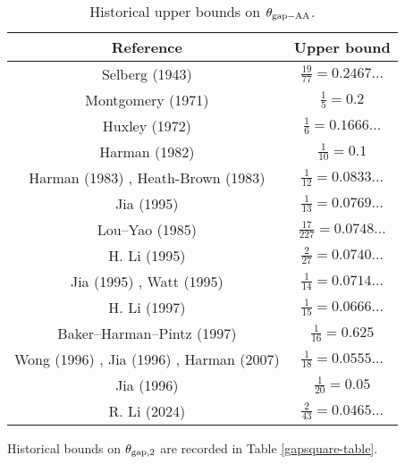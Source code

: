 \begin{table}[ht]
    \caption{Historical upper bounds on $\theta_{\mathrm{gap-AA}}$.}
    \centering
    \renewcommand{\arraystretch}{1.2}
    \begin{tabular}{|c|c|}
    \hline
    Reference & Upper bound \\
    \hline
    Selberg (1943) \cite{selberg_1943} & $\frac{19}{77}=0.2467\dots$\\
    \hline
    Montgomery (1971) \cite{montgomery_topics_1971} & $\frac{1}{5}=0.2$ \\
    \hline
    Huxley (1972) \cite{Huxley} & $\frac{1}{6} = 0.1666\dots$ \\
    \hline
    Harman (1982) \cite{harman_1982} & $\frac{1}{10} = 0.1$ \\
    \hline
    Harman (1983) \cite{harman_1983}, Heath-Brown (1983) \cite{heathbrown_sieve_1984}  & $\frac{1}{12} = 0.0833\dots$ \\
    \hline
    Jia (1995) \cite{jia_goldbach_1994} & $\frac{1}{13} = 0.0769\dots$ \\
    \hline
    Lou--Yao (1985) \cite{lou_yao_1985} & $\frac{17}{227}= 0.0748\dots$ \\
    \hline
    H. Li (1995) \cite{li_goldbach_1995} & $\frac{2}{27} = 0.0740\dots$ \\
    \hline
    Jia (1995) \cite{jia_difference_1995}, Watt (1995) \cite{watt_short_1995} & $\frac{1}{14}=0.0714\dots$ \\
    \hline
    H. Li (1997) \cite{li_short_1997} & $\frac{1}{15}=0.0666\dots$ \\
    \hline
    Baker--Harman--Pintz (1997) \cite{baker-harman-pintz_goldbach_1997} & $\frac{1}{16} = 0.625$ \\
    \hline
    Wong (1996) \cite{wong_thesis_1996}, Jia (1996) \cite{jia_exceptional_1996}, Harman (2007) \cite{harman-book} & $\frac{1}{18} = 0.0555\dots$ \\
    \hline
    Jia (1996) \cite{jia_almost_all} & $\frac{1}{20} = 0.05$ \\
    \hline
    R. Li (2024) \cite{li_primes_almost_2024} & $\frac{2}{43} = 0.0465\dots$ \\
    \hline
    \end{tabular}
    \end{table}\label{gapaa-table}

    Historical bounds on $\theta_{\mathrm{gap},2}$ are recorded in Table \ref{gapsquare-table}.

